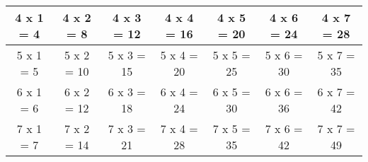 \documentclass[a4paper,landscape,11pt]{article}
\begin{document}
\begin{tabular}{|c|c|c|c|c|c|c|}
  
  \\ \hline
  
  
  4 x 1 = 4
  
  &
  
  
  4 x 2 = 8
  
  &
  
  
  4 x 3 = 12
  
  &
  
  
  4 x 4 = 16
  
  &
  
  
  4 x 5 = 20
  
  &
  
  
  4 x 6 = 24
  
  &
  
  
  4 x 7 = 28
  
  
  \\ \hline
  
  
  5 x 1 = 5
  
  &
  
  
  5 x 2 = 10
  
  &
  
  
  5 x 3 = 15
  
  &
  
  
  5 x 4 = 20
  
  &
  
  
  5 x 5 = 25
  
  &
  
  
  5 x 6 = 30
  
  &
  
  
  5 x 7 = 35
  
  
  \\ \hline
  
  
  6 x 1 = 6
  
  &
  
  
  6 x 2 = 12
  
  &
  
  
  6 x 3 = 18
  
  &
  
  
  6 x 4 = 24
  
  &
  
  
  6 x 5 = 30
  
  &
  
  
  6 x 6 = 36
  
  &
  
  
  6 x 7 = 42
  
  
  \\ \hline
  
  
  7 x 1 = 7
  
  &
  
  
  7 x 2 = 14
  
  &
  
  
  7 x 3 = 21
  
  &
  
  
  7 x 4 = 28
  
  &
  
  
  7 x 5 = 35
  
  &
  
  
  7 x 6 = 42
  
  &
  
  
  7 x 7 = 49
  
  
  \\ \hline
  
\end{tabular}
\end{document}
